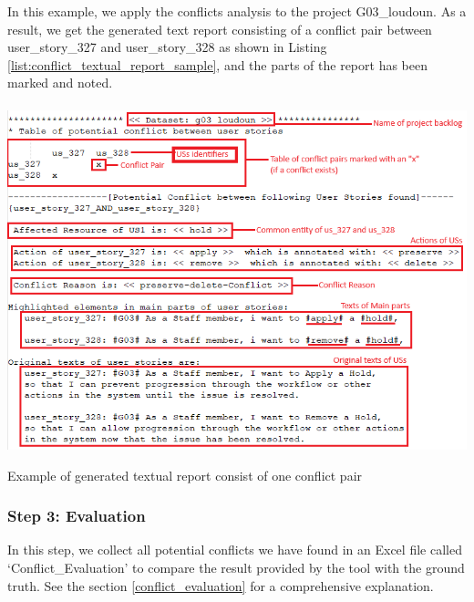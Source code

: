 \begin{example}
In this example, we apply the conflicts analysis to the project G03\_loudoun. As a result, we get the generated text report consisting of a conflict pair between user\_story\_327 and user\_story\_328 as shown in Listing \ref{list:conflict_textual_report_sample}, and the parts of the report has been marked and noted.
\begin{MyListing}
	\paragraph{}
	\centering
	\includegraphics[scale=0.7]{Listing/conflict_textual_report_sample.png}
	\caption{Example of generated textual report consist of one conflict pair}\label{list:conflict_textual_report_sample}
\end{MyListing}
\end{example}
\subsubsection*{Step 3: Evaluation}
In this step, we collect all potential conflicts we have found in an Excel file called ‘Conflict\_Evaluation’ to compare the result provided by the tool with the ground truth. See the section \ref{conflict_evaluation} for a comprehensive explanation.



